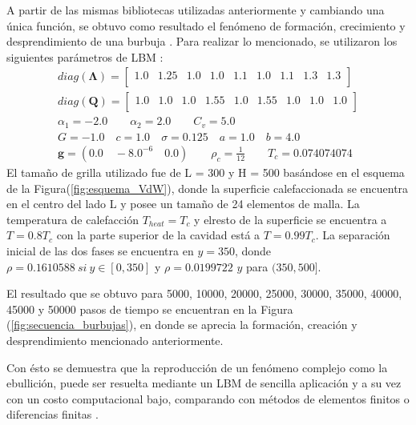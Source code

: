 A partir de las mismas bibliotecas utilizadas anteriormente y cambiando una única función, se obtuvo como resultado el fenómeno de formación, crecimiento y desprendimiento de una burbuja . Para realizar lo mencionado, se utilizaron los siguientes parámetros de LBM :
\begin{align*}
diag(\mathbf{\Lambda}) = 
\begin{bmatrix}
1.0 & 1.25 & 1.0 & 1.0 & 1.1 & 1.0 & 1.1 & 1.3 & 1.3 \\
\end{bmatrix}\\
diag(\mathbf{Q}) = 
\begin{bmatrix}
1.0 & 1.0 & 1.0 & 1.55 & 1.0 & 1.55 & 1.0 & 1.0 & 1.0 \\
\end{bmatrix}\\
\alpha_{1} = -2.0 \qquad 	\alpha_{2} = 2.0 \qquad C_{v} = 5.0\\
G = -1.0 \quad c = 1.0 \quad \sigma = 0.125 \quad a = 1.0 \quad b = 4.0 \\
\mathbf{g} = (0.0 \quad -8.0^{-6} \quad 0.0 ) \qquad \rho_c = \frac{1}{12} \qquad T_c = 0.074074074
\end{align*}
El tamaño de grilla utilizado fue de L = 300 y H = 500 basándose en el esquema de la Figura(\ref{fig:esquema_VdW}), donde la superficie calefaccionada se encuentra en el centro del lado L y posee un tamaño de 24 elementos de malla. La temperatura de calefacción $T_{heat} = T_c$  y elresto de la superficie se encuentra a $T = 0.8 T_c$ con la parte superior de la cavidad está a $T = 0.99 T_c$. La separación inicial de las dos fases se encuentra en $y = 350$, donde $\rho = 0.1610588 \> si \> y \in [0,350]$ y $\rho = 0.0199722$ $y$ para $(350,500]$.

El resultado que se obtuvo para 5000, 10000, 20000, 25000, 30000, 35000, 40000, 45000 y 50000 pasos de tiempo se encuentran en la Figura (\ref{fig:secuencia_burbujas}), en donde se aprecia la formación, creación y desprendimiento mencionado anteriormente.

Con ésto se demuestra que la reproducción de un fenómeno complejo como la ebullición, puede ser resuelta mediante un LBM de sencilla aplicación y a su vez con un costo computacional bajo, comparando con métodos de elementos finitos o diferencias finitas \cite{guo2013lattice}.

